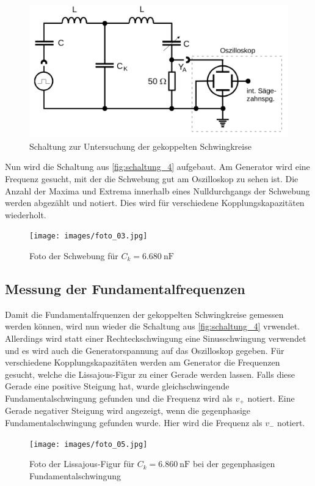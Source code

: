 \begin{figure}
    \centering
    \includegraphics[width=\textwidth/2]{images/schaltung_4.png}
    \caption{Schaltung zur Untersuchung der gekoppelten Schwingkreise\cite{V355}}
    \label{fig:schaltung_4}
\end{figure}

Nun wird die Schaltung aus \autoref{fig:schaltung_4} aufgebaut.
Am Generator wird eine Frequenz gesucht, mit der die Schwebung gut am Oszilloskop zu sehen ist. Die Anzahl der Maxima und Extrema innerhalb eines Nulldurchgangs der Schwebung werden abgezählt und notiert. 
Dies wird für verschiedene Kopplungskapazitäten wiederholt.

\begin{figure}
    \centering
    \texttt{[image: images/foto\_03.jpg]}
    \caption{Foto der Schwebung für $C_k = \SI{6.680}{\nano\farad}$}
    \label{fig:foto_03}
\end{figure}

\subsection{Messung der Fundamentalfrequenzen}
\label{sec:frequenzen}

Damit die Fundamentalfrquenzen der gekoppelten Schwingkreise gemessen werden können, wird nun wieder die Schaltung aus \autoref{fig:schaltung_4} vrwendet.
Allerdings wird statt einer Rechteckschwingung eine Sinusschwingung verwendet und es wird auch die Generatorspannung auf das Oszilloskop gegeben.
Für verschiedene Kopplungskapazitäten werden am Generator die Frequenzen gesucht, welche die Lissajous-Figur zu einer Gerade werden lassen. 
Falls diese Gerade eine positive Steigung hat, wurde gleichschwingende Fundamentalschwingung gefunden und die Frequenz wird als $v_+$ notiert.
Eine Gerade negativer Steigung wird angezeigt, wenn die gegenphasige Fundamentalschwingung gefunden wurde. Hier wird die Frequenz als $v_-$ notiert.
\begin{figure}
    \centering
    \texttt{[image: images/foto\_05.jpg]}
    \caption{Foto der Lissajous-Figur für $C_k = \SI{6.860}{\nano\farad}$ bei der gegenphasigen Fundamentalschwingung}
    \label{fig:foto_05}
\end{figure}

